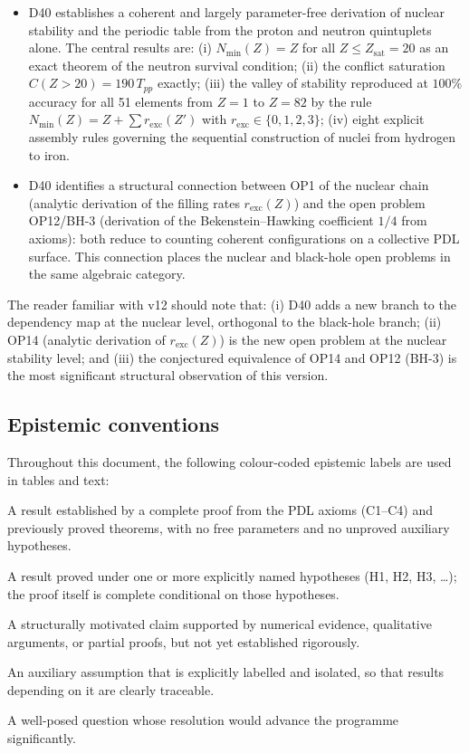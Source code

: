 \documentclass[11pt,a4paper]{article}
\theoremstyle{plain}
\theoremstyle{definition}
\theoremstyle{remark}
\newcommand{\Tpp}{T_{pp}}
\newcommand{\Zsat}{Z_{\mathrm{sat}}}
\newcommand{\Nmin}{N_{\min}}
\begin{document}
\begin{itemize}
\item D40 establishes a coherent and largely parameter-free derivation of nuclear stability and the periodic table from the proton and neutron quintuplets alone. The central results are: (i) $\Nmin(Z) = Z$ for all $Z \leq \Zsat = 20$ as an exact theorem of the neutron survival condition; (ii) the conflict saturation $C(Z>20) = 190\,\Tpp$ exactly; (iii) the valley of stability reproduced at $100\%$ accuracy for all 51 elements from $Z=1$ to $Z=82$ by the rule $\Nmin(Z) = Z + \sum r_{\mathrm{exc}}(Z')$ with $r_{\mathrm{exc}} \in \{0,1,2,3\}$; (iv) eight explicit assembly rules governing the sequential construction of nuclei from hydrogen to iron.
\item D40 identifies a structural connection between OP1 of the nuclear chain (analytic derivation of the filling rates $r_{\mathrm{exc}}(Z)$) and the open problem OP12/BH-3 (derivation of the Bekenstein--Hawking coefficient $1/4$ from axioms): both reduce to counting coherent configurations on a collective PDL surface. This connection places the nuclear and black-hole open problems in the same algebraic category.
\end{itemize}

The reader familiar with v12 should note that: (i) D40 adds a new branch to the dependency map at the nuclear level, orthogonal to the black-hole branch; (ii) OP14 (analytic derivation of $r_{\mathrm{exc}}(Z)$) is the new open problem at the nuclear stability level; and (iii) the conjectured equivalence of OP14 and OP12 (BH-3) is the most significant structural observation of this version.

\subsection{Epistemic conventions}
\label{subsec:conventions}

Throughout this document, the following colour-coded epistemic labels are used in tables and text:
\begin{description}[leftmargin=2.5cm,style=nextline]
\item[\textcolor{proofblue}{Theorem}] A result established by a complete proof from the PDL axioms (C1--C4) and previously proved theorems, with no free parameters and no unproved auxiliary hypotheses.
\item[\textcolor{proofblue}{Theorem (H)}] A result proved under one or more explicitly named hypotheses (H1, H2, H3, \ldots); the proof itself is complete conditional on those hypotheses.
\item[\textcolor{conjecturegreen}{Conjecture}] A structurally motivated claim supported by numerical evidence, qualitative arguments, or partial proofs, but not yet established rigorously.
\item[\textcolor{hypothesisorange}{Named Hypothesis}] An auxiliary assumption that is explicitly labelled and isolated, so that results depending on it are clearly traceable.
\item[\textcolor{openproblemred}{Open Problem}] A well-posed question whose resolution would advance the programme significantly.
\end{description}
\end{document}
